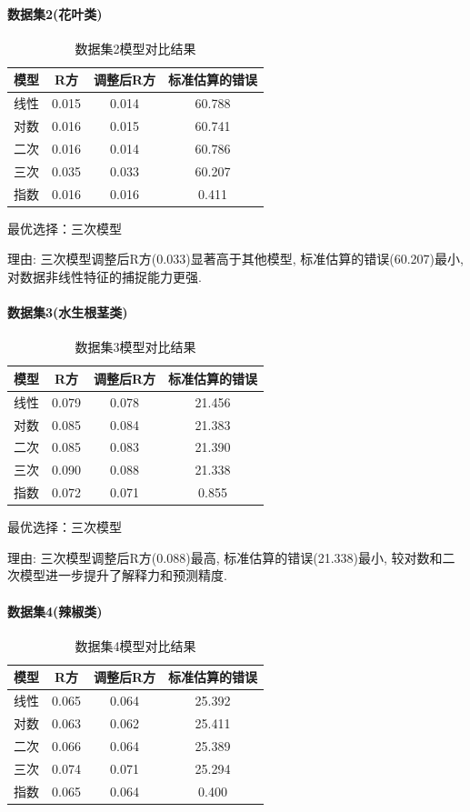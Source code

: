 \documentclass{cumcmthesis}
\begin{document}
\paragraph{数据集2(花叶类)}
\begin{table}[H]
\centering
\begin{tabular}{cccc}
\hline
模型 & R方 & 调整后R方 & 标准估算的错误 \\
\hline
线性 & 0.015 & 0.014 & 60.788 \\
对数 & 0.016 & 0.015 & 60.741 \\
二次 & 0.016 & 0.014 & 60.786 \\
三次 & 0.035 & 0.033 & 60.207 \\
指数 & 0.016 & 0.016 & 0.411 \\
\hline
\end{tabular}
\caption{数据集2模型对比结果}
\label{tab:dataset2}
\end{table}

最优选择：三次模型

理由: 三次模型调整后R方(0.033)显著高于其他模型, 标准估算的错误(60.207)最小, 对数据非线性特征的捕捉能力更强. 


\paragraph{数据集3(水生根茎类)}
\begin{table}[H]
\centering
\begin{tabular}{cccc}
\hline
模型 & R方 & 调整后R方 & 标准估算的错误 \\
\hline
线性 & 0.079 & 0.078 & 21.456 \\
对数 & 0.085 & 0.084 & 21.383 \\
二次 & 0.085 & 0.083 & 21.390 \\
三次 & 0.090 & 0.088 & 21.338 \\
指数 & 0.072 & 0.071 & 0.855 \\
\hline
\end{tabular}
\caption{数据集3模型对比结果}
\label{tab:dataset3}
\end{table}

最优选择：三次模型

理由: 三次模型调整后R方(0.088)最高, 标准估算的错误(21.338)最小, 较对数和二次模型进一步提升了解释力和预测精度. 


\paragraph{数据集4(辣椒类)}
\begin{table}[H]
\centering
\begin{tabular}{cccc}
\hline
模型 & R方 & 调整后R方 & 标准估算的错误 \\
\hline
线性 & 0.065 & 0.064 & 25.392 \\
对数 & 0.063 & 0.062 & 25.411 \\
二次 & 0.066 & 0.064 & 25.389 \\
三次 & 0.074 & 0.071 & 25.294 \\
指数 & 0.065 & 0.064 & 0.400 \\
\hline
\end{tabular}
\caption{数据集4模型对比结果}
\label{tab:dataset4}
\end{table}
\end{document}
